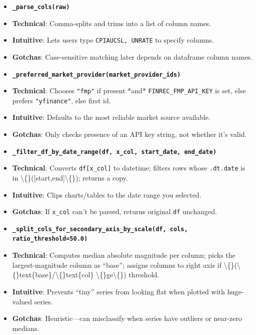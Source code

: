 \documentclass[11pt]{article}
\begin{document}
\begin{itemize}[leftmargin=*,nosep]
\item \textbf{\texttt{\_parse\_cols(raw)}}
\item \textbf{Technical}: Comma-splits and trims into a list of column names.
\item \textbf{Intuitive}: Lets users type \texttt{CPIAUCSL, UNRATE} to specify columns.
\item \textbf{Gotchas}: Case-sensitive matching later depends on dataframe column names.
\end{itemize}


\begin{itemize}[leftmargin=*,nosep]
\item \textbf{\texttt{\_preferred\_market\_provider(market\_provider\_ids)}}
\item \textbf{Technical}: Chooses \texttt{"fmp"} if present *and* \texttt{FINREC\_FMP\_API\_KEY} is set, else prefers \texttt{"yfinance"}, else first id.
\item \textbf{Intuitive}: Defaults to the most reliable market source available.
\item \textbf{Gotchas}: Only checks presence of an API key string, not whether it’s valid.
\end{itemize}


\begin{itemize}[leftmargin=*,nosep]
\item \textbf{\texttt{\_filter\_df\_by\_date\_range(df, x\_col, start\_date, end\_date)}}
\item \textbf{Technical}: Converts \texttt{df[x\_col]} to datetime; filters rows whose \texttt{.dt.date} is in \textbackslash\{\}([start,end]\textbackslash\{\}); returns a copy.
\item \textbf{Intuitive}: Clips charts/tables to the date range you selected.
\item \textbf{Gotchas}: If \texttt{x\_col} can’t be parsed, returns original \texttt{df} unchanged.
\end{itemize}


\begin{itemize}[leftmargin=*,nosep]
\item \textbf{\texttt{\_split\_cols\_for\_secondary\_axis\_by\_scale(df, cols, ratio\_threshold=50.0)}}
\item \textbf{Technical}: Computes median absolute magnitude per column; picks the largest-magnitude column as “base”; assigns columns to right axis if \textbackslash\{\}(\textbackslash\{\}text\{base\}/\textbackslash\{\}text\{col\} \textbackslash\{\}ge\textbackslash\{\}) threshold.
\item \textbf{Intuitive}: Prevents “tiny” series from looking flat when plotted with huge-valued series.
\item \textbf{Gotchas}: Heuristic—can misclassify when series have outliers or near-zero medians.
\end{itemize}
\end{document}
